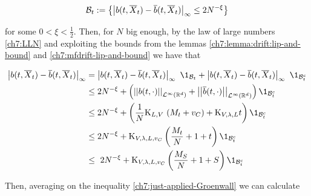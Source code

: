 \begin{equation*}
	\mathcal{B}_t := \left\{
	\left| b(t, \overline{X}_t) - \overline{b}(t, \overline{X}_t) \right|_\infty \leq 2N^{-\xi}
	\right\}
\end{equation*}

for some $0 < \xi < \frac{1}{2}$.
Then, for $N$ big enough, by the law of large numbers \ref{ch7:LLN} and exploiting the bounds from the lemmas \ref{ch7:lemma:drift:lip-and-bound} and \ref{ch7:mfdrift-lip-and-bound} we have that


\begin{align*}
	\norm{\drift(t, \mfsol_t) - \mfdrift(t, \mfsol_t)}_\infty 
	&=
	\norm{\drift(t, \mfsol_t) - \mfdrift(t, \mfsol_t)}_\infty\
	\1_{\setB_t
	}
	+
	\norm{\drift(t, \mfsol_t) - \mfdrift(t, \mfsol_t)}_\infty\
	\1_{\setB_t^c
	}
	\\
	&\leq
	2N^{-\xi}
	+
	\left(
	\Norm{
		\drift(t, \cdot)
	}_{\Lpspace^\infty(\R^d)}
	+
	\Norm{
		\mfdrift(t, \cdot)
	}_{\Lpspace^\infty(\R^d)}	
	\right)
	\1_{\setB_t^c}
	\\
	&\leq
		2N^{-\xi}
		+
		\left(
			\frac{1}{N}
			\const_{\NumCampRelease, \attraction}\
			(\hmactive_t + \cdrift)
			+
			\const_{\attraction, \lambda,\NumCampRelease} t
		\right)
		\1_{\setB_t^c}
		\\
		&\leq
			2N^{-\xi}
			+
			\const_{\attraction, \lambda,\NumCampRelease,\cdrift} 
			\left(
				\frac{\hmactive_t}{N}
				+
				1
				+
				t
			\right)
			\1_{\setB_t^c}\
		\\
		&\leq\
			2N^{-\xi}
			+
			\const_{\attraction, \lambda,\NumCampRelease,\cdrift} 
			\left(
			\frac{\hmactive_S}{N}
			+
			1
			+
			S
			\right)
			\1_{\setB_t^c}
\end{align*}

Then, averaging on the inequality \ref{ch7:just-applied-Groenwall} we can calculate

